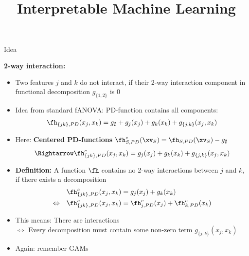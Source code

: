 \documentclass[11pt,compress,t,notes=noshow, aspectratio=169, xcolor=table]{beamer}
\title{Interpretable Machine Learning}
\date{}
\begin{document}
\newcommand{\titlefigure}{figure/h-statistic}
\newcommand{\learninggoals}{
\item Understand Friedman's H-statistic for two purposes:
\item Measure general $k$-way interactions between arbitrary features
\item Measure a single feature's overall interaction strength
}




\begin{frame}{Idea }

    \textbf{2-way interaction:}
    \begin{itemize}
        \item Two features $j$ and $k$ do not interact, if their 2-way interaction component in functional decomposition $g_{\{1,2\}}$ is 0
        \item Idea from standard fANOVA: PD-function contains all components:
        $$
        \fh_{\{jk\}, PD}(x_j, x_k)
        = g_\emptyset + g_j(x_j) + g_k(x_k) + g_{\{j,k\}}(x_j, x_k)
        $$
        \item Here: \textbf{Centered PD-functions} $\fh_{S,PD}^c(\xv_S) = \fh_{S,PD}(\xv_S) - g_\emptyset$
        $$
        \Rightarrow \fh^c_{\{jk\}, PD}(x_j, x_k)
        = g_j(x_j) + g_k(x_k) + g_{\{j,k\}}(x_j, x_k)
        $$
        \item \textbf{Definition:} A function $\fh$ contains no 2-way interactions between $j$ and $k$, if there exists a decomposition
        \begin{align*}
            & \fh_{\{jk\}, PD}^c(x_j, x_k)
            = g_j(x_j) + g_k(x_k) \\
            \Leftrightarrow \quad
            & \fh_{\{jk\}, PD}^c(x_j, x_k)
            = \fh^c_{j, PD}(x_j) + \fh^c_{k, PD}(x_k)
        \end{align*}
        \item This means: There are interactions \\
        $\Leftrightarrow$ Every decomposition must contain some non-zero term $g_{\{j,k\}}(x_j, x_k)$
        \item Again: remember GAMs
    \end{itemize}
    


\end{frame}
\end{document}
